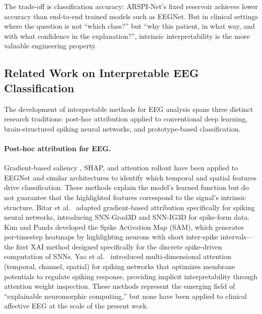 The trade-off is classification accuracy: ARSPI-Net's fixed reservoir achieves lower accuracy than end-to-end trained models such as EEGNet. But in clinical settings where the question is not ``which class?'' but ``why this patient, in what way, and with what confidence in the explanation?'', intrinsic interpretability is the more valuable engineering property.

\subsection{Related Work on Interpretable EEG Classification}
\label{sec:interp_related_work}

The development of interpretable methods for EEG analysis spans three distinct research traditions: post-hoc attribution applied to conventional deep learning, brain-structured spiking neural networks, and prototype-based classification.

\paragraph{Post-hoc attribution for EEG.} Gradient-based saliency \cite{shrikumar_deeplift_2017}, SHAP, and attention rollout have been applied to EEGNet and similar architectures to identify which temporal and spatial features drive classification. These methods explain the model's learned function but do not guarantee that the highlighted features correspond to the signal's intrinsic structure. Bitar et al.\ \cite{bitar_snn_grad_2023} adapted gradient-based attribution specifically for spiking neural networks, introducing SNN-Grad3D and SNN-IG3D for spike-form data. Kim and Panda \cite{kim_sam_2021} developed the Spike Activation Map (SAM), which generates per-timestep heatmaps by highlighting neurons with short inter-spike intervals---the first XAI method designed specifically for the discrete spike-driven computation of SNNs. Yao et al.\ \cite{yao_attention_snn_2023} introduced multi-dimensional attention (temporal, channel, spatial) for spiking networks that optimizes membrane potentials to regulate spiking response, providing implicit interpretability through attention weight inspection. These methods represent the emerging field of ``explainable neuromorphic computing,'' but none have been applied to clinical affective EEG at the scale of the present work.

